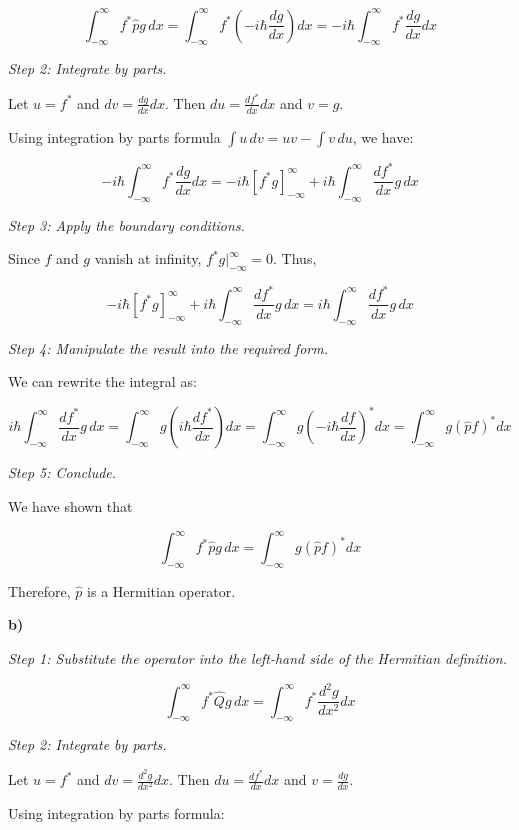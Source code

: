 \documentclass{article}
\begin{document}
\[
\int_{-\infty}^{\infty} f^* \hat{p} g \, dx = \int_{-\infty}^{\infty} f^* \left( -i\hbar \frac{d g}{dx} \right) dx = -i\hbar \int_{-\infty}^{\infty} f^* \frac{dg}{dx} dx
\]

\textit{Step 2: Integrate by parts.}

Let $u = f^*$ and $dv = \frac{dg}{dx} dx$. Then $du = \frac{df^*}{dx} dx$ and $v = g$.

Using integration by parts formula $\int u \, dv = uv - \int v \, du$, we have:

\[
-i\hbar \int_{-\infty}^{\infty} f^* \frac{dg}{dx} dx = -i\hbar \left[ f^* g \right]_{-\infty}^{\infty} + i\hbar \int_{-\infty}^{\infty} \frac{df^*}{dx} g \, dx
\]

\textit{Step 3: Apply the boundary conditions.}

Since $f$ and $g$ vanish at infinity, $f^* g \Big|_{-\infty}^{\infty} = 0$. Thus,

\[
-i\hbar \left[ f^* g \right]_{-\infty}^{\infty} + i\hbar \int_{-\infty}^{\infty} \frac{df^*}{dx} g \, dx = i\hbar \int_{-\infty}^{\infty} \frac{df^*}{dx} g \, dx
\]

\textit{Step 4: Manipulate the result into the required form.}

We can rewrite the integral as:

\[
i\hbar \int_{-\infty}^{\infty} \frac{df^*}{dx} g \, dx = \int_{-\infty}^{\infty} g \left( i\hbar \frac{df^*}{dx} \right) dx = \int_{-\infty}^{\infty} g \left( -i\hbar \frac{df}{dx} \right)^* dx = \int_{-\infty}^{\infty} g (\hat{p} f)^* dx
\]

\textit{Step 5: Conclude.}

We have shown that

\[
\int_{-\infty}^{\infty} f^* \hat{p} g \, dx = \int_{-\infty}^{\infty} g (\hat{p} f)^* dx
\]

Therefore, $\hat{p}$ is a Hermitian operator.

\textbf{b)}

\textit{Step 1: Substitute the operator into the left-hand side of the Hermitian definition.}

\[
\int_{-\infty}^{\infty} f^* \hat{Q} g \, dx = \int_{-\infty}^{\infty} f^* \frac{d^2 g}{dx^2} dx
\]

\textit{Step 2: Integrate by parts.}

Let $u = f^*$ and $dv = \frac{d^2 g}{dx^2} dx$. Then $du = \frac{df^*}{dx} dx$ and $v = \frac{dg}{dx}$.

Using integration by parts formula:
\end{document}
